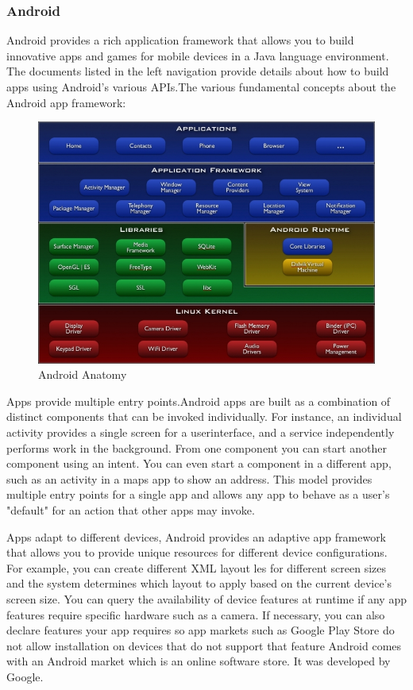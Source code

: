 \subsubsection{Android}


Android provides a rich application framework that allows you to build innovative
apps and games for mobile devices in a Java language environment. The documents
listed in the left navigation provide details about how to build apps using Android's
various APIs.The various fundamental concepts about the Android app framework:

\begin{figure}[ht]
\centering
\includegraphics[scale=0.38]{images/a1.jpg}
\caption{Android Anatomy}
\label{fig:Anatomy}
\end{figure}

Apps provide multiple entry points.Android apps are built as a combination of distinct components that can be invoked individually. For instance, an individual activity provides a single screen for a userinterface, and a service independently performs work in the background. From one component you can start another component using an intent. You can even start a component in a different app, such as an activity in a maps app to show an
address. This model provides multiple entry points for a single app and allows any
app to behave as a user's "default" for an action that other apps may invoke.

Apps adapt to different devices, Android provides an adaptive app framework that allows you to provide unique resources for different device configurations. For example, you can create different XML layout les for different screen sizes and the system determines which layout
to apply based on the current device's screen size. You can query the availability of device features at runtime if any app features require specific hardware such as
a camera. If necessary, you can also declare features your app requires so app markets such as Google Play Store do not allow installation on devices that do not
support that feature Android comes with an Android market which is an online
software store. It was developed by Google.

